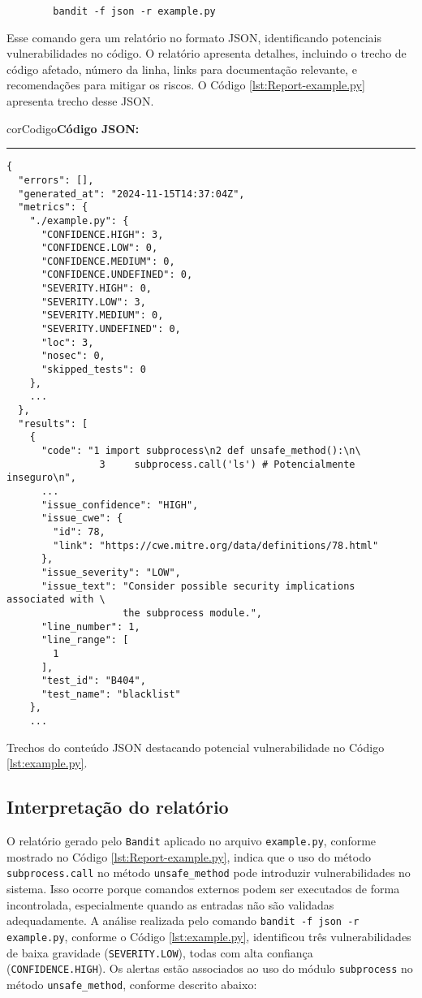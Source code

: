 \begin{verbatim}
        bandit -f json -r example.py
\end{verbatim}

Esse comando gera um relatório no formato JSON, identificando potenciais vulnerabilidades no código. O relatório apresenta detalhes, incluindo o trecho de código afetado, número da linha, links para documentação relevante, e recomendações para mitigar os riscos. O Código \ref{lst:Report-example.py} apresenta trecho desse JSON.
\begin{listing}[!ht]
    \begin{myboxCode}{corCodigo}{\textbf{Código JSON: }}\vspace{3mm}
    \hrule
    \begin{verbatim}
{
  "errors": [],
  "generated_at": "2024-11-15T14:37:04Z",
  "metrics": {
    "./example.py": {
      "CONFIDENCE.HIGH": 3,
      "CONFIDENCE.LOW": 0,
      "CONFIDENCE.MEDIUM": 0,
      "CONFIDENCE.UNDEFINED": 0,
      "SEVERITY.HIGH": 0,
      "SEVERITY.LOW": 3,
      "SEVERITY.MEDIUM": 0,
      "SEVERITY.UNDEFINED": 0,
      "loc": 3,
      "nosec": 0,
      "skipped_tests": 0
    },
    ...
  },
  "results": [
    {
      "code": "1 import subprocess\n2 def unsafe_method():\n\
                3     subprocess.call('ls') # Potencialmente inseguro\n",
      ...
      "issue_confidence": "HIGH",
      "issue_cwe": {
        "id": 78,
        "link": "https://cwe.mitre.org/data/definitions/78.html"
      },
      "issue_severity": "LOW",
      "issue_text": "Consider possible security implications associated with \
                    the subprocess module.",
      "line_number": 1,
      "line_range": [
        1
      ],
      "test_id": "B404",
      "test_name": "blacklist"
    },
    ...
\end{verbatim}
\end{myboxCode}
\caption{Trechos do conteúdo JSON destacando potencial vulnerabilidade no Código \ref{lst:example.py}.}
\label{lst:Report-example.py}
\end{listing}



\subsection{Interpretação do relatório}

O relatório gerado pelo \texttt{Bandit} aplicado no arquivo \texttt{example.py}, conforme mostrado no Código \ref{lst:Report-example.py}, indica que o uso do método \texttt{subprocess.call} no método \texttt{unsafe\_method} pode introduzir vulnerabilidades no sistema. Isso ocorre porque comandos externos podem ser executados de forma incontrolada, especialmente quando as entradas não são validadas adequadamente.
%
A análise realizada pelo comando \texttt{bandit -f json -r example.py}, conforme o Código \ref{lst:example.py}, identificou três vulnerabilidades de baixa gravidade (\texttt{SEVERITY.LOW}), todas com alta confiança (\texttt{CONFIDENCE.HIGH}). Os alertas estão associados ao uso do módulo \texttt{subprocess} no método \texttt{unsafe\_method}, conforme descrito abaixo:

